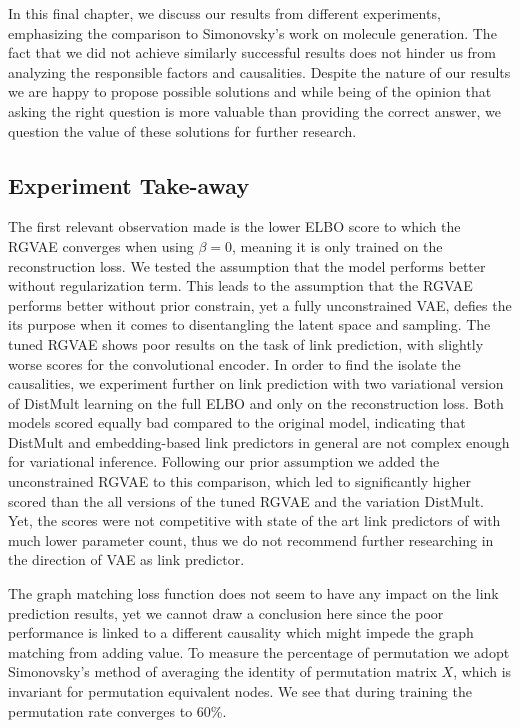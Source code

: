 

In this final chapter, we discuss our results from different experiments, emphasizing the comparison to Simonovsky's work on molecule generation. The fact that we did not achieve similarly successful results does not hinder us from analyzing the responsible factors and causalities. Despite the nature of our results we are happy to propose possible solutions and while being of the opinion that asking the right question is more valuable than providing the correct answer, we question the value of these solutions for further research.

\subsection{Experiment Take-away}


The first relevant observation made is the lower ELBO score to which the RGVAE converges when using $\beta=0$, meaning it is only trained on the reconstruction loss.
We tested the assumption that the model performs better without regularization term. This leads to the assumption that the RGVAE performs better without prior constrain, yet a fully unconstrained VAE, defies the its purpose when it comes to disentangling the latent space and sampling.
The tuned RGVAE shows poor results on the task of link prediction, with slightly worse scores for the convolutional encoder. In order to find the isolate the causalities, we experiment further on link prediction with two variational version of DistMult learning on the full ELBO and only on the reconstruction loss. Both models scored equally bad compared to the original model, indicating that DistMult and embedding-based link predictors in general are not complex enough for variational inference. Following our prior assumption we added the unconstrained RGVAE to this comparison, which led to significantly higher scored than the all versions of the tuned RGVAE and the variation DistMult. Yet, the scores were not competitive with state of the art link predictors of with much lower parameter count, thus we do not recommend further researching in the direction of VAE as link predictor.

The graph matching loss function does not seem to have any impact on the link prediction results, yet we cannot draw a conclusion here since the poor performance is linked to a different causality which might impede the graph matching from adding value. To measure the percentage of permutation we adopt Simonovsky's method of averaging the identity of permutation matrix $X$, which is invariant for permutation equivalent nodes. We see that during training the permutation rate converges to $60$\%.

